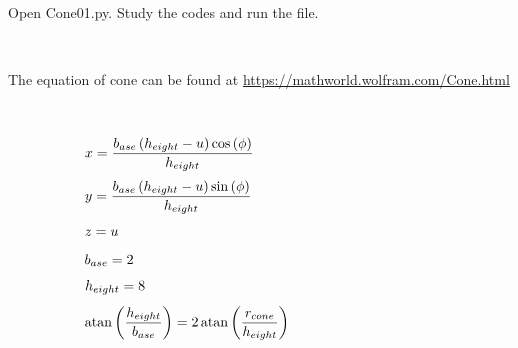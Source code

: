 \documentclass[10pt,a4paper,leqno]{article}
\begin{document}
\begin{CJK*}{UTF8}{gbsn}
\noindent Open Cone01.py. Study the codes and run the file.
 \par \ \par\noindent The equation of cone can be found at \url{https://mathworld.wolfram.com/Cone.html} 
 \par \ \par\begin{equation}
 \begin{minipage}{250pt}
                \begin{flushleft} $\displaystyle x = \frac{b_{ase} \left(h_{eight} - u\right) \cos{\left(\phi \right)}}{h_{eight}}$  \end{flushleft}
 \end{minipage}
 \end{equation}
\begin{equation}
 \begin{minipage}{250pt}
                \begin{flushleft} $\displaystyle y = \frac{b_{ase} \left(h_{eight} - u\right) \sin{\left(\phi \right)}}{h_{eight}}$  \end{flushleft}
 \end{minipage}
 \end{equation}
\begin{equation}
 \begin{minipage}{250pt}
                \begin{flushleft} $\displaystyle z = u$  \end{flushleft}
 \end{minipage}
 \end{equation}
\begin{equation}
 \begin{minipage}{250pt}
                \begin{flushleft} $\displaystyle b_{ase} = 2$  \end{flushleft}
 \end{minipage}
 \end{equation}
\begin{equation}
 \begin{minipage}{250pt}
                \begin{flushleft} $\displaystyle h_{eight} = 8$  \end{flushleft}
 \end{minipage}
 \end{equation}
\begin{equation}
 \begin{minipage}{250pt}
                \begin{flushleft} $\displaystyle \operatorname{atan}{\left(\frac{h_{eight}}{b_{ase}} \right)} = 2 \operatorname{atan}{\left(\frac{r_{cone}}{h_{eight}} \right)}$  \end{flushleft}

\end{minipage}
\end{equation}
\end{CJK*}
\end{document}
